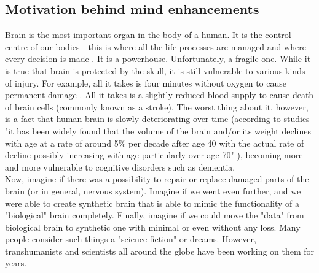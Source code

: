 \documentclass[12pt]{article}
\begin{document}
\subsection{Motivation behind mind enhancements}
	Brain is the most important organ in the body of a human. It is the control centre of our bodies - this is where all the life processes are managed and where every decision is made \cite{brain:1}. It is a powerhouse. Unfortunately, a fragile one. While it is true that brain is protected by the skull, it is still vulnerable to various kinds of injury. For example, all it takes is four minutes without oxygen to cause permanent damage \cite{lackofoxygen}. All it takes is a slightly reduced blood supply to cause death of brain cells (commonly known as a stroke)\cite{stroke:1}. The worst thing about it, however, is a fact that human brain is slowly deteriorating over time (according to studies "it has been widely found that the volume of the brain and/or its weight declines with age at a rate of around 5\% per decade after age 40 with the actual rate of decline possibly increasing with age particularly over age 70" \cite{brainAging}), becoming more and more vulnerable to cognitive disorders such as dementia.
	\\Now, imagine if there was a possibility to repair or replace damaged parts of the brain (or in general, nervous system). Imagine if we went even further, and we were able to create synthetic brain that is able to mimic the functionality of a "biological" brain completely. Finally, imagine if we could move the "data" from biological brain to synthetic one with minimal or even without any loss. Many people consider such things a "science-fiction" or dreams. However, transhumanists and scientists all around the globe have been working on them for years.
\end{document}
